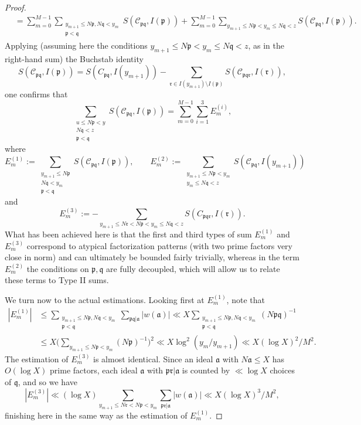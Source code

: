 \documentclass[11pt,reqno]{amsart}
\numberwithin{equation}{section}
\theoremstyle{definition}
\theoremstyle{remark}
\newcommand{\mc}{\mathcal}
\newcommand{\mf}{\mathfrak}
\renewcommand{\le}{\leqslant}
\begin{document}
\begin{proof}
\begin{align*}
&=\sum_{m=0}^{M-1} \sum_{\substack{y_{m+1} \le N\mf{p}, N\mf{q} < y_m \\ \mf{p} < \mf{q} }}S(\mc{C}_{\mf{p}\mf{q}},I(\mf{p})) + \sum_{m = 0}^{M-1}\sum_{y_{m+1}\le N\mf{p}<y_m\le N\mf{q}<z}S(\mc{C}_{\mf{p}\mf{q}},I(\mf{p})).
\end{align*}
Applying (assuming here the conditions $y_{m+1}\le N\mf{p}<y_m\le N\mf{q}<z$, as in the right-hand sum) the Buchstab identity
\[S(\mc{C}_{\mf{p} \mf{q}}, I(\mf{p})) = S(C_{\mf p \mf q}, I(y_{m+1})) - \sum_{\mf{r} \in I(y_{m+1}) \setminus I(\mf{p})}  S(\mc{C}_{\mf{p} \mf{q} \mf{r}}, I(\mf{r})),\]
one confirms that
\begin{equation}\label{buchstab-levels} \sum_{\substack{u \le N\mf{p} < y \\ N\mf{q} < z \\ \mf{p} < \mf{q}}}   S(\mc{C}_{\mf{p}\mf{q}},I(\mf{p})) 
 = \sum_{m=0}^{M-1} \sum_{i = 1}^3 E^{(i)}_m,\end{equation} where
 \[ E^{(1)}_m := 
\sum_{\substack{y_{m+1} \le N\mf{p} \\ N\mf{q} < y_m \\ \mf{p} < \mf{q} }}S(\mc{C}_{\mf{p}\mf{q}},I(\mf{p})), \qquad E^{(2)}_m := \sum_{\substack{y_{m+1}\le N\mf{p}<y_m \\ y_m\le N\mf{q}<z}}S(\mc{C}_{\mf{p}\mf{q}},I(y_{m+1})) \] and
\[ E^{(3)}_m := -\sum_{y_{m+1} \le N\mf{r} < N\mf{p} < y_m \le N\mf{q} < z} S(C_{\mf{p} \mf{q} \mf{r}}, I(\mf{r})).\]
What has been achieved here is that the first and third types of sum $E^{(1)}_m$ and $E^{(3)}_m$ correspond to atypical factorization patterns (with two prime factors very close in norm) and can ultimately be bounded fairly trivially, whereas in the term $E^{(2)}_m$ the conditions on $\mf{p}, \mf{q}$ are fully decoupled, which will allow us to relate these terms to Type II sums.

We turn now to the actual estimations. Looking first at $E^{(1)}_m$, note that 
\begin{align}\nonumber |E^{(1)}_m| &\le \sum_{\substack{y_{m+1}\le N\mf{p}, N\mf{q}<y_m \\ \mf{p} < \mf{q}}}\sum_{\mf{p}\mf{q}|\mf{a}}|w(\mf{a})|\ll X\sum_{\substack{y_{m+1}\le N\mf{p}, N\mf{q}<y_m \\ \mf{p} < \mf{q}}}(N\mf{p}\mf{q})^{-1}\\ 
&\le X\bigg(\sum_{y_{m+1}\le N\mf{p}<y_{m}}(N\mf{p})^{-1}\bigg)^2\ll X \log^2 (y_m/y_{m+1})\ll X(\log X)^2/M^2.\label{e1-est}
\end{align}
The estimation of $E^{(3)}_m$ is almost identical. Since an ideal $\mf{a}$ with $N\mf{a} \le X$ has $O(\log X)$ prime factors, each ideal $\mf{a}$ with $\mf{p} \mf{r} | \mf{a}$ is counted by $\ll \log X$ choices of $\mf{q}$, and so we have
\begin{equation}\label{e3-est}
|E^{(3)}_m| \ll  (\log X)\sum_{y_{m+1}\le N\mf{r}< N\mf{p}<y_m}\sum_{\mf{p}\mf{r}|\mf{a}}|w(\mf{a})| \ll  X(\log X)^3/M^2,
\end{equation} finishing here in the same way as the estimation of $E^{(1)}_m$.\vspace*{8pt}




\end{proof}
\end{document}
